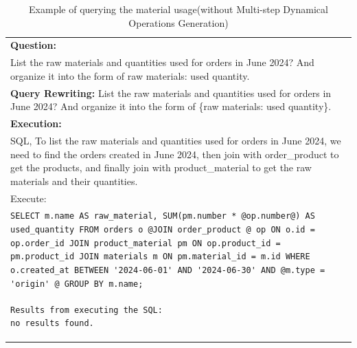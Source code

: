 \documentclass[preprint,12pt]{elsarticle}
\begin{document}
\begin{center}
\begin{longtable}{p{390pt}}
\caption{Example of querying the material usage(without Multi-step Dynamical Operations Generation)}
    \label{tab:case_query_material_without_muti_step}\\
    \toprule
      \textbf{Question:}     \\
       List the raw materials and quantities used for orders in June 2024? And organize it into the form of {raw materials: used quantity}.\\
          \hline
          \textbf{Query Rewriting: }
          List the raw materials and quantities used for orders in June 2024? And organize it into the form of \{raw materials: used quantity\}.\\
 \hline

\hline
\textbf{Execution:}\\
SQL, To list the raw materials and quantities used for orders in June 2024, we need to find the orders created in June 2024, then join with order\_product to get the products, and finally join with product\_material to get the raw materials and their quantities.\\
Execute:\\
\lstinline!SELECT m.name AS raw_material, SUM(pm.number * @op.number@) AS used_quantity FROM orders o @JOIN order_product @ op ON o.id = op.order_id JOIN product_material pm ON op.product_id = pm.product_id JOIN materials m ON pm.material_id = m.id WHERE o.created_at BETWEEN '2024-06-01' AND '2024-06-30' AND @m.type = 'origin' @ GROUP BY m.name;! \\
\begin{lstlisting}[style=sql_command]
Results from executing the SQL:
no results found.
\end{lstlisting}\\ \hline
\end{longtable}
\end{center}
\end{document}
